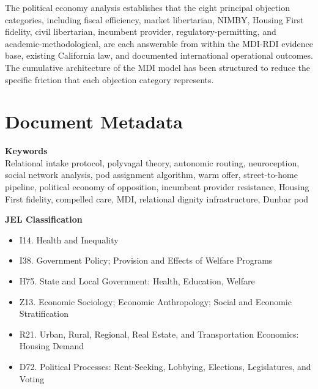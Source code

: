 \documentclass[12pt, letterpaper]{article}
\begin{document}
\begin{titlepage}
\begin{minipage}{0.95\textwidth}
\vspace{0.2cm}
The political economy analysis establishes that the eight principal objection categories, including fiscal efficiency, market libertarian, NIMBY, Housing First fidelity, civil libertarian, incumbent provider, regulatory-permitting, and academic-methodological, are each answerable from within the MDI-RDI evidence base, existing California law, and documented international operational outcomes. The cumulative architecture of the MDI model has been structured to reduce the specific friction that each objection category represents.

\end{minipage}
\end{titlepage}


\newpage
\section*{Document Metadata}

\noindent\textbf{Keywords}\\[1pt]
Relational intake protocol, polyvagal theory, autonomic routing, neuroception, social network analysis, pod assignment algorithm, warm offer, street-to-home pipeline, political economy of opposition, incumbent provider resistance, Housing First fidelity, compelled care, MDI, relational dignity infrastructure, Dunbar pod

\vspace{8pt}
\noindent\textbf{JEL Classification}
\begin{itemize}[nosep, before={\vspace{-8pt}}, leftmargin=2em]
    \item I14. Health and Inequality
    \item I38. Government Policy; Provision and Effects of Welfare Programs
    \item H75. State and Local Government: Health, Education, Welfare
    \item Z13. Economic Sociology; Economic Anthropology; Social and Economic Stratification
    \item R21. Urban, Rural, Regional, Real Estate, and Transportation Economics: Housing Demand
    \item D72. Political Processes: Rent-Seeking, Lobbying, Elections, Legislatures, and Voting
\end{itemize}
\end{document}
